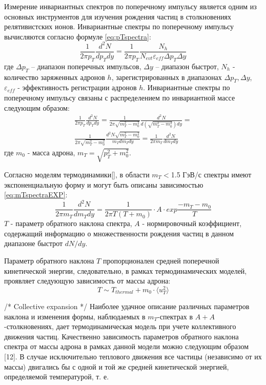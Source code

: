 Измерение инвариантных спектров по поперечному импульсу является одним из основных инструментов для изучения рождения частиц в столкновениях релятивистских ионов.
Инвариантные спектры по поперечному импульсу вычисляются согласно формуле \ref{eq:pTspectra}:
\begin{equation}
	\label{eq:pTspectra}
	\frac{1}{2\pi p_T} \frac{d^2 N}{dp_T dy}=\frac{1}{2\pi p_T}\frac{N_h}{N_{evt} \varepsilon_{eff} \Delta p_T \Delta y}
\end{equation}
где $\Delta p_T$ – диапазон поперечных импульсов, $\Delta y$ – диапазон быстрот, $N_h$ - количество заряженных адронов $h$, зарегистрированных в диапазонах  $\Delta p_T, \Delta y$,  $\varepsilon_{eff}$ - эффективность регистрации адронов $h$.
Инвариантные спектры по поперечному импульсу связаны с распределением по инвариантной массе следующим образом:
\begin{equation}
	\label{eq:mTspectra}
	\begin{split}
		\frac{1}{2\pi p_T} \frac{d^2 N}{dp_T dy}=
		\frac{1}{2\pi \sqrt{m_T^2-m_0^2}} \frac{d^2 N}{d(\sqrt{m_T^2-m_0^2})dy}=\\
		\frac{1}{2\pi \sqrt{m_T^2-m_0^2}} \frac{d^2 N \sqrt{m_T^2-m_0^2}}{m_T dm_Tdy}=\frac{1}{2\pi m_T} \frac{d^2 N}{dm_Tdy}
	\end{split}
\end{equation}
где $m_0$ - масса адрона, $m_T = \sqrt{p_{T}^{2}+m_0^2}$.


Согласно моделям термодинамики[], в области $m_T<$1.5 ГэВ/с спектры имеют экспоненциальную форму и могут быть описаны  зависимостью \ref{eq:mTspectraEXP}:
\begin{equation}
	\label{eq:mTspectraEXP}
	\frac{1}{2\pi m_T} \frac{d^2 N}{dm_T dy}=\frac{1}{2\pi T (T+m_0)}\cdot A \cdot exp{\frac{-m_T -m_0}{T}}
\end{equation}
$T$ - параметр обратного наклона спектра, $A$ - нормировочный коэффициент, содержащий информацию о множественности рождения частиц в данном диапазоне быстрот $dN/dy$.

Параметр обратного наклона $T$ пропорционален средней поперечной кинетической энергии, следовательно, в рамках термодинамических моделей, проявляет следующую зависимость от массы адрона:
$$ T \sim T_{thermal}+m_0 \cdot \langle u_T ^2 \rangle$$


/* Collective expansion */
Наиболее удачное описание различных параметров наклона и изменения формы, наблюдаемых в $m_T$-спектрах в $A+A$-столкновениях, дает термодинамическая модель при учете коллективного движения частиц. %
Качественно зависимость параметров обратного наклона спектра от массы адрона в рамках данной модели можно следующим образом [12]. В случае исключительно теплового движения все частицы (независимо от их массы) двигались бы с одной и той же средней кинетической энергией, определяемой температурой, т. е.

